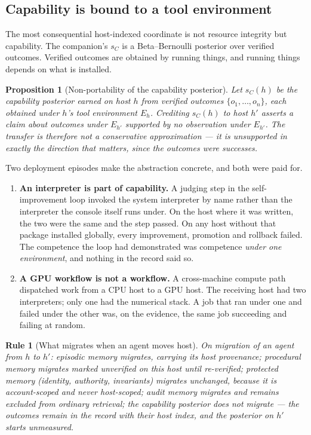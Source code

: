 \documentclass[11pt]{article}
\newtheorem{drule}{Rule}
\newtheorem{proposition}{Proposition}
\begin{document}
\subsection{Capability is bound to a tool environment}

The most consequential host-indexed coordinate is not resource integrity but capability. The companion's $s_C$ is a Beta--Bernoulli posterior over verified outcomes. Verified outcomes are obtained by running things, and running things depends on what is installed.

\begin{proposition}[Non-portability of the capability posterior]
\label{prop:nonportable}
Let $s_C(h)$ be the capability posterior earned on host $h$ from verified outcomes $\{o_1,\dots,o_n\}$, each obtained under $h$'s tool environment $E_h$. Crediting $s_C(h)$ to host $h'$ asserts a claim about outcomes under $E_{h'}$ supported by no observation under $E_{h'}$. The transfer is therefore not a conservative approximation --- it is unsupported in exactly the direction that matters, since the outcomes were successes.
\end{proposition}

Two deployment episodes make the abstraction concrete, and both were paid for.

\begin{enumerate}
\item \textbf{An interpreter is part of capability.} A judging step in the self-improvement loop invoked the system interpreter by name rather than the interpreter the console itself runs under. On the host where it was written, the two were the same and the step passed. On any host without that package installed globally, every improvement, promotion and rollback failed. The competence the loop had demonstrated was competence \emph{under one environment}, and nothing in the record said so.
\item \textbf{A GPU workflow is not a workflow.} A cross-machine compute path dispatched work from a CPU host to a GPU host. The receiving host had two interpreters; only one had the numerical stack. A job that ran under one and failed under the other was, on the evidence, the same job succeeding and failing at random.
\end{enumerate}

\begin{drule}[What migrates when an agent moves host]
\label{rule:migrate}
On migration of an agent from $h$ to $h'$:
\emph{episodic memory} migrates, carrying its host provenance;
\emph{procedural memory} migrates marked \emph{unverified on this host} until re-verified;
\emph{protected memory} (identity, authority, invariants) migrates unchanged, because it is account-scoped and never host-scoped;
\emph{audit memory} migrates and remains excluded from ordinary retrieval;
the \emph{capability posterior} does not migrate --- the outcomes remain in the record with their host index, and the posterior on $h'$ starts unmeasured.
\end{drule}
\end{document}
